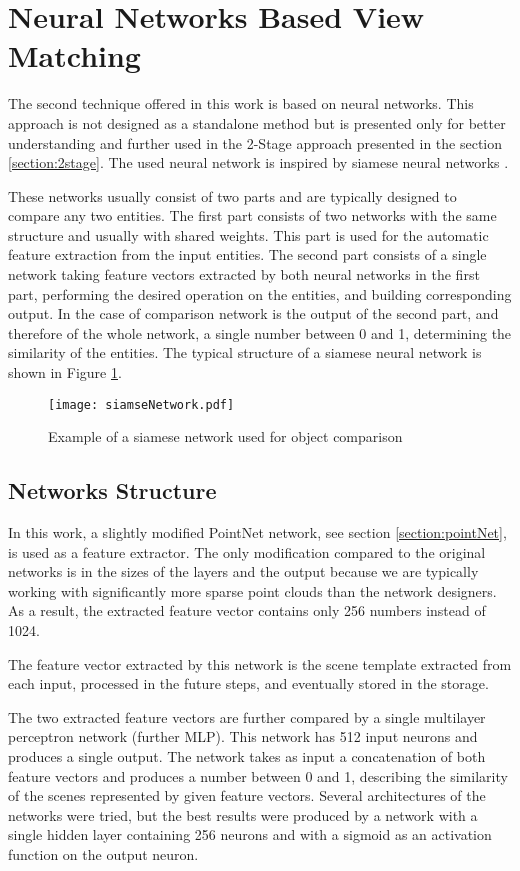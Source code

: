 \section{Neural Networks Based View Matching}\label{section:nnMatching}

The second technique offered in this work is based on neural networks. This approach is not designed as a standalone method but is presented only for better understanding and further used in the 2-Stage approach presented in the section \ref{section:2stage}. The used neural network is inspired by siamese neural networks \cite{siamese}.\par
These networks usually consist of two parts and are typically designed to compare any two entities. The first part consists of two networks with the same structure and usually with shared weights. This part is used for the automatic feature extraction from the input entities. The second part consists of a single network taking feature vectors extracted by both neural networks in the first part, performing the desired operation on the entities, and building corresponding output. In the case of comparison network is the output of the second part, and therefore of the whole network, a single number between 0 and 1, determining the similarity of the entities. The typical structure of a siamese neural network is shown in Figure \ref{fig:siamseNetwork}.

\begin{figure}[htpb]
    \centering
    \texttt{[image: siamseNetwork.pdf]}
    \caption{Example of a siamese network used for object comparison} \label{fig:siamseNetwork}
\end{figure}

\subsection{Networks Structure}

In this work, a slightly modified PointNet network, see section \ref{section:pointNet}, is used as a feature extractor. The only modification compared to the original networks is in the sizes of the layers and the output because we are typically working with significantly more sparse point clouds than the network designers. As a result, the extracted feature vector contains only 256 numbers instead of 1024.\par
The feature vector extracted by this network is the scene template extracted from each input, processed in the future steps, and eventually stored in the storage.\par
The two extracted feature vectors are further compared by a single multilayer perceptron network (further MLP). This network has 512 input neurons and produces a single output. The network takes as input a concatenation of both feature vectors and produces a number between 0 and 1, describing the similarity of the scenes represented by given feature vectors. Several architectures of the networks were tried, but the best results were produced by a network with a single hidden layer containing 256 neurons and with a sigmoid as an activation function on the output neuron.

